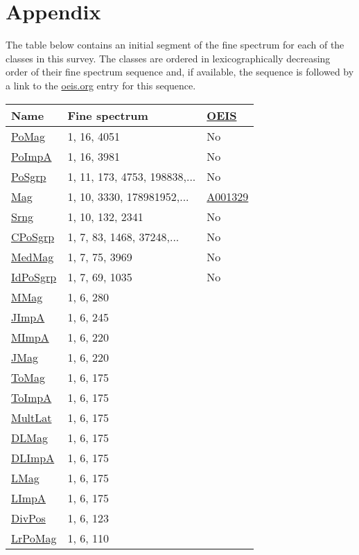 
\twocolumn

\chapter*{Appendix}

The table below contains an initial segment of the fine spectrum for each of the classes in this survey. The classes are ordered in lexicographically decreasing order of their fine spectrum sequence and, if available, the sequence is followed by a link to the \url{oeis.org} entry for this sequence.

{\small
\begin{tabular}{|l|l|l|}\hline
Name& Fine spectrum& \href{oeis.org}{OEIS}\\\hline
\hyperlink{PoMag}{PoMag}& 1, 16, 4051 &No\\
\hyperlink{PoImpA}{PoImpA}& 1, 16, 3981 &No\\
\hyperlink{PoSgrp}{PoSgrp}& 1, 11, 173, 4753, 198838,...&No\\
\hyperlink{Mag}{Mag}& 1, 10, 3330, 178981952,...&\href{http://oeis.org/A001329}{A001329}\\
\hyperlink{Srng}{Srng}& 1, 10, 132, 2341 &No\\
\hyperlink{CPoSgrp}{CPoSgrp}& 1, 7, 83, 1468, 37248,... &No\\
\hyperlink{MedMag}{MedMag}& 1, 7, 75, 3969 &No\\
\hyperlink{IdPoSgrp}{IdPoSgrp}& 1, 7, 69, 1035 &No\\
\hyperlink{MMag}{MMag}& 1, 6, 280&\\
\hyperlink{JImpA}{JImpA}& 1, 6, 245&\\
\hyperlink{MImpA}{MImpA}& 1, 6, 220&\\
\hyperlink{JMag}{JMag}& 1, 6, 220&\\
\hyperlink{ToMag}{ToMag}& 1, 6, 175&\\
\hyperlink{ToImpA}{ToImpA}& 1, 6, 175&\\
\hyperlink{MultLat}{MultLat}& 1, 6, 175&\\
\hyperlink{DLMag}{DLMag}& 1, 6, 175&\\
\hyperlink{DLImpA}{DLImpA}& 1, 6, 175&\\
\hyperlink{LMag}{LMag}& 1, 6, 175&\\
\hyperlink{LImpA}{LImpA}& 1, 6, 175&\\
\hyperlink{DivPos}{DivPos}& 1, 6, 123 &\\
\hyperlink{LrPoMag}{LrPoMag}& 1, 6, 110&\\

\end{tabular}}
